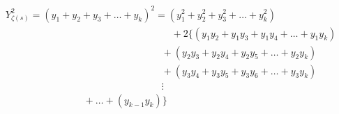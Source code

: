 \documentclass{amsart}
\begin{document}
	\[ \begin{array}{c}
		Y_{\zeta(s)}^2 = (y_1 {+} y_2 {+} y_3 {+} \dots {+} y_k)^2 = (y_1^2 {+} y_2^2 {+} y_3^2 {+} \dots {+} y_k^2) \\
		\qquad\qquad\qquad\qquad\qquad\qquad\qquad\qquad\quad {+} 2\{(y_1y_2 {+} y_1y_3 {+} y_1y_4 {+} \dots {+} y_{1}y_{k}) \\ 
		\qquad\qquad\qquad\qquad\qquad\qquad\qquad\qquad {+} (y_2y_3 {+} y_2y_4 {+} y_2y_5 {+} \dots {+} y_2y_{k}) \\ 
		\qquad\qquad\qquad\qquad\qquad\qquad\qquad\qquad {+} (y_3y_4 {+} y_3y_5 {+} y_3y_6 {+} \dots {+} y_3y_{k}) \\ 
		\qquad\qquad\qquad\qquad\qquad\qquad\qquad\qquad \vdots \\
		\qquad\qquad\qquad\qquad {+} \dots {+} (y_{k-1}y_{k}) \} \\ 
	\end{array} \]
	\[\]
	
\end{document}
